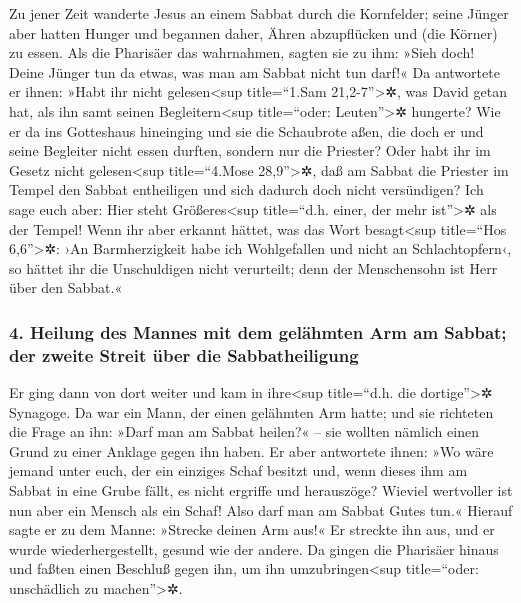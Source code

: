  Zu jener Zeit wanderte Jesus an einem Sabbat durch die
Kornfelder; seine Jünger aber hatten Hunger und begannen daher, Ähren
abzupflücken und (die Körner) zu essen.  Als die Pharisäer
das wahrnahmen, sagten sie zu ihm: »Sieh doch! Deine Jünger tun da
etwas, was man am Sabbat nicht tun darf!«  Da antwortete
er ihnen: »Habt ihr nicht gelesen\textless sup title=``1.Sam
21,2-7''\textgreater✲, was David getan hat, als ihn samt seinen
Begleitern\textless sup title=``oder: Leuten''\textgreater✲ hungerte?
 Wie er da ins Gotteshaus hineinging und sie die
Schaubrote aßen, die doch er und seine Begleiter nicht essen durften,
sondern nur die Priester?  Oder habt ihr im Gesetz nicht
gelesen\textless sup title=``4.Mose 28,9''\textgreater✲, daß am Sabbat
die Priester im Tempel den Sabbat entheiligen und sich dadurch doch
nicht versündigen?  Ich sage euch aber: Hier steht
Größeres\textless sup title=``d.h. einer, der mehr ist''\textgreater✲
als der Tempel!  Wenn ihr aber erkannt hättet, was das
Wort besagt\textless sup title=``Hos 6,6''\textgreater✲: ›An
Barmherzigkeit habe ich Wohlgefallen und nicht an Schlachtopfern‹, so
hättet ihr die Unschuldigen nicht verurteilt;  denn der
Menschensohn ist Herr über den Sabbat.«

\hypertarget{heilung-des-mannes-mit-dem-geluxe4hmten-arm-am-sabbat-der-zweite-streit-uxfcber-die-sabbatheiligung}{%
\subsubsection{4. Heilung des Mannes mit dem gelähmten Arm am Sabbat;
der zweite Streit über die
Sabbatheiligung}\label{heilung-des-mannes-mit-dem-geluxe4hmten-arm-am-sabbat-der-zweite-streit-uxfcber-die-sabbatheiligung}}

 Er ging dann von dort weiter und kam in ihre\textless sup
title=``d.h. die dortige''\textgreater✲ Synagoge.  Da war
ein Mann, der einen gelähmten Arm hatte; und sie richteten die Frage an
ihn: »Darf man am Sabbat heilen?« -- sie wollten nämlich einen Grund zu
einer Anklage gegen ihn haben.  Er aber antwortete ihnen:
»Wo wäre jemand unter euch, der ein einziges Schaf besitzt und, wenn
dieses ihm am Sabbat in eine Grube fällt, es nicht ergriffe und
herauszöge?  Wieviel wertvoller ist nun aber ein Mensch
als ein Schaf! Also darf man am Sabbat Gutes tun.« 
Hierauf sagte er zu dem Manne: »Strecke deinen Arm aus!« Er streckte ihn
aus, und er wurde wiederhergestellt, gesund wie der andere.
 Da gingen die Pharisäer hinaus und faßten einen Beschluß
gegen ihn, um ihn umzubringen\textless sup title=``oder: unschädlich zu
machen''\textgreater✲.

